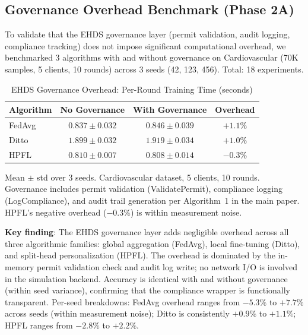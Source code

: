\documentclass[conference]{IEEEtran}
\begin{document}
\subsection{Governance Overhead Benchmark (Phase 2A)}
\label{sec:governance_overhead}

To validate that the EHDS governance layer (permit validation, audit logging, compliance tracking) does not impose significant computational overhead, we benchmarked 3 algorithms with and without governance on Cardiovascular (70K samples, 5 clients, 10 rounds) across 3 seeds (42, 123, 456). Total: 18 experiments.

\begin{table}[htbp]
\centering
\caption{EHDS Governance Overhead: Per-Round Training Time (seconds)}
\label{tab:governance_overhead}
\small
\begin{tabular}{lccc}
\toprule
\textbf{Algorithm} & \textbf{No Governance} & \textbf{With Governance} & \textbf{Overhead} \\
\midrule
FedAvg & $0.837 \pm 0.032$ & $0.846 \pm 0.039$ & $+1.1\%$ \\
Ditto & $1.899 \pm 0.032$ & $1.919 \pm 0.034$ & $+1.0\%$ \\
HPFL & $0.810 \pm 0.007$ & $0.808 \pm 0.014$ & $-0.3\%$ \\
\bottomrule
\end{tabular}

\vspace{1mm}
\par{\footnotesize Mean $\pm$ std over 3 seeds. Cardiovascular dataset, 5 clients, 10 rounds. Governance includes permit validation (ValidatePermit), compliance logging (LogCompliance), and audit trail generation per Algorithm~1 in the main paper. HPFL's negative overhead ($-0.3\%$) is within measurement noise.}
\end{table}

\textbf{Key finding}: The EHDS governance layer adds negligible overhead across all three algorithmic families: global aggregation (FedAvg), local fine-tuning (Ditto), and split-head personalization (HPFL). The overhead is dominated by the in-memory permit validation check and audit log write; no network I/O is involved in the simulation backend. Accuracy is identical with and without governance (within seed variance), confirming that the compliance wrapper is functionally transparent. Per-seed breakdowns: FedAvg overhead ranges from $-5.3\%$ to $+7.7\%$ across seeds (within measurement noise); Ditto is consistently $+0.9\%$ to $+1.1\%$; HPFL ranges from $-2.8\%$ to $+2.2\%$.
\end{document}

